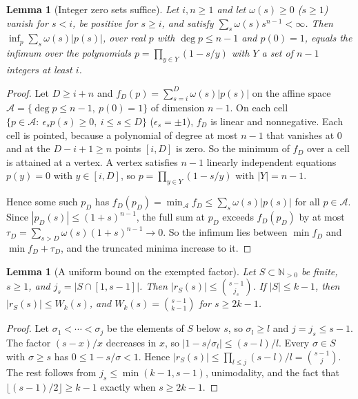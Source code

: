 \documentclass[11pt]{article}
\newtheorem{lemma}[theorem]{Lemma}
\newcommand{\N}{\mathbb N}
\begin{document}
\begin{lemma}[Integer zero sets suffice]\label{lem:intzeros}
Let $i,n\ge1$ and let $\omega(s)\ge0$ ($s\ge1$) vanish for $s<i$, be
positive for $s\ge i$, and satisfy $\sum_s\omega(s)s^{n-1}<\infty$.  Then
$\inf_p\sum_s\omega(s)|p(s)|$, over real $p$ with $\deg p\le n-1$ and
$p(0)=1$, equals the infimum over the polynomials
$p=\prod_{y\in Y}(1-s/y)$ with $Y$ a set of $n-1$ integers at least $i$.
\end{lemma}

\begin{proof}
Let $D\ge i+n$ and $f_D(p)=\sum_{s=i}^D\omega(s)|p(s)|$ on the affine space
$\mathcal A=\{\deg p\le n-1,\ p(0)=1\}$ of dimension $n-1$.  On each cell
$\{p\in\mathcal A:\ \epsilon_sp(s)\ge0,\ i\le s\le D\}$
($\epsilon_s=\pm1$), $f_D$ is linear and nonnegative.  Each cell is
pointed, because a polynomial of degree at most $n-1$ that vanishes at $0$
and at the $D-i+1\ge n$ points $[i,D]$ is zero.  So the minimum of $f_D$ over
a cell is attained at a vertex.  A vertex satisfies $n-1$ linearly
independent equations $p(y)=0$ with $y\in[i,D]$, so
$p=\prod_{y\in Y}(1-s/y)$ with $|Y|=n-1$.

Hence some such $p_D$ has $f_D(p_D)=\min_{\mathcal A}f_D\le
\sum_s\omega(s)|p(s)|$ for all $p\in\mathcal A$.  Since
$|p_D(s)|\le(1+s)^{n-1}$, the full sum at $p_D$ exceeds $f_D(p_D)$ by at
most $\tau_D=\sum_{s>D}\omega(s)(1+s)^{n-1}\to0$.  So the infimum lies
between $\min f_D$ and $\min f_D+\tau_D$, and the truncated minima increase
to it.
\end{proof}

\begin{lemma}[A uniform bound on the exempted factor]\label{lem:rowpointwise}
Let $S\subset\N_{>0}$ be finite, $s\ge1$, and $j_s=|S\cap[1,s-1]|$.  Then
$|r_S(s)|\le\binom{s-1}{j_s}$.  If $|S|\le k-1$, then
$|r_S(s)|\le W_k(s)$, and $W_k(s)=\binom{s-1}{k-1}$ for $s\ge2k-1$.
\end{lemma}

\begin{proof}
Let $\sigma_1<\cdots<\sigma_{j}$ be the elements of $S$ below $s$, so
$\sigma_l\ge l$ and $j=j_s\le s-1$.  The factor $(s-x)/x$ decreases in $x$, so
$|1-s/\sigma_l|\le(s-l)/l$.  Every $\sigma\in S$ with $\sigma\ge s$ has
$0\le1-s/\sigma<1$.  Hence
$|r_S(s)|\le\prod_{l\le j}(s-l)/l=\binom{s-1}j$.  The rest follows from
$j_s\le\min(k-1,s-1)$, unimodality, and the fact that
$\lfloor(s-1)/2\rfloor\ge k-1$ exactly when $s\ge2k-1$.
\end{proof}
\end{document}
